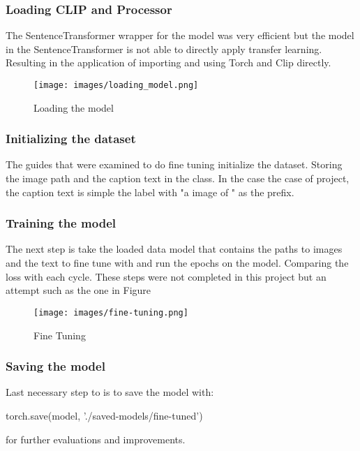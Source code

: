 \documentclass[letterpaper, 10 pt, conference]{ieeeconf}  %
\begin{document}
\subsubsection{Loading CLIP and Processor}
The SentenceTransformer wrapper for the model was very efficient but the model in the SentenceTransformer is
not able to directly apply transfer learning.
Resulting in the application of importing and using Torch and Clip directly. 

\begin{figure}[h]
\texttt{[image: images/loading\_model.png]}
\caption{Loading the model \cite{fine-tune}}
\label{fig:loading_model}
\end{figure}

\subsubsection{Initializing the dataset}
The guides that were examined to do fine tuning initialize the dataset. Storing the image path and the 
caption text in the class. 
In the case the case of project, the caption text is simple the label with "a image of " as the prefix.  

\subsubsection{Training the model}
The next step is take the loaded data model that contains the paths to images and the text to fine tune with
and run the epochs on the model. Comparing the loss with each cycle. These steps were not completed in this
project but an attempt such as the one in Figure 

\begin{figure}[h]
\texttt{[image: images/fine-tuning.png]}
\caption{Fine Tuning \cite{fine-tune}}
\label{fig:fine-tune}
\end{figure}

\subsubsection{Saving the model}
Last necessary step to is to save the model with:
\begin{python}
torch.save(model, './saved-models/fine-tuned')
\end{python}
for further evaluations and improvements. 
\end{document}
